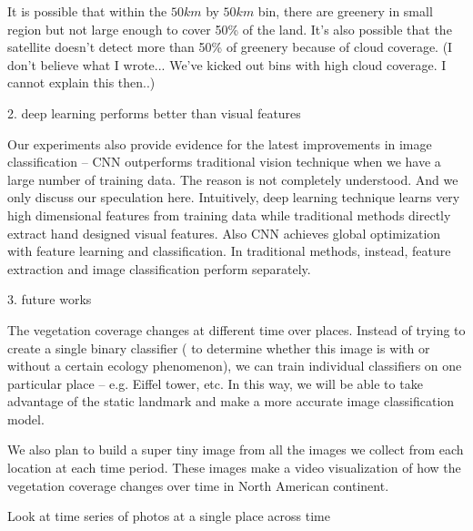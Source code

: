 It is possible that within the $50 km$ by $50 km$ bin, there are greenery in small region but not large enough to cover 50\% of the land. It's also possible that the satellite doesn't detect more than 50\% of greenery because of cloud coverage. (I don't believe what I wrote... We've kicked out bins with high cloud coverage. I cannot explain this then..)


2. deep learning performs better than visual features

Our experiments also provide evidence for the latest improvements in image classification -- CNN outperforms traditional vision technique when
 we have a large number of training data. The reason is not completely understood. And we only 
discuss our speculation here.
Intuitively, deep learning technique learns very high dimensional features from training data
while traditional methods directly extract hand designed visual features. Also CNN achieves 
global optimization with feature
learning and classification. In traditional methods, instead, feature extraction and image
classification perform separately.



3. future works

The vegetation coverage changes at different time over places. 
Instead of trying to create a single binary classifier ( to determine whether this image is with or
without a certain ecology phenomenon),
we can train individual classifiers on one particular place 
-- e.g. Eiffel tower, etc. 
In this way, we will be able to 
take advantage of the static landmark and make a more accurate image classification model.


We also plan to build a super tiny image from all the images we collect from each location at each time period. 
These images make a video visualization of how the vegetation coverage changes over time in North American continent.

Look at time series of photos at a single place across time 

